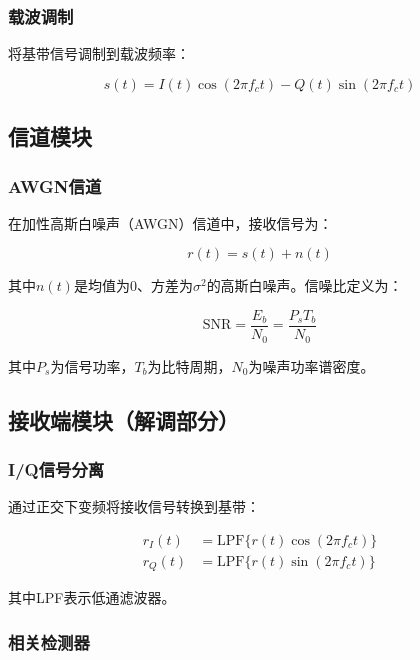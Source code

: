 \documentclass[12pt,a4paper,twoside]{article}
\numberwithin{equation}{section}
\begin{document}
\subsubsection{载波调制}

将基带信号调制到载波频率：

\begin{equation}
    s(t) = I(t)\cos(2\pi f_c t) - Q(t)\sin(2\pi f_c t)
\end{equation}

\subsection{信道模块}
\subsubsection{AWGN信道}

在加性高斯白噪声（AWGN）信道中，接收信号为：

\begin{equation}
    r(t) = s(t) + n(t)
\end{equation}

其中$n(t)$是均值为0、方差为$\sigma^2$的高斯白噪声。信噪比定义为：

\begin{equation}
    \text{SNR} = \frac{E_b}{N_0} = \frac{P_s T_b}{N_0}
\end{equation}

其中$P_s$为信号功率，$T_b$为比特周期，$N_0$为噪声功率谱密度。

\subsection{接收端模块（解调部分）}
\subsubsection{I/Q信号分离}

通过正交下变频将接收信号转换到基带：

\begin{align}
    r_I(t) &= \text{LPF}\{r(t)\cos(2\pi f_c t)\} \\
    r_Q(t) &= \text{LPF}\{r(t)\sin(2\pi f_c t)\}
\end{align}

其中LPF表示低通滤波器。

\subsubsection{相关检测器}
\end{document}
